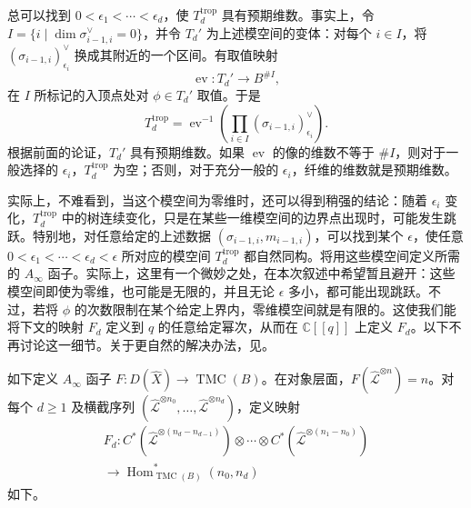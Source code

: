 总可以找到 $0<\epsilon_1<\cdots<\epsilon_d$，使 $T_d^{\mathrm{trop}}$ 具有预期维数。事实上，令 $I=\{i\mid\dim\sigma_{i-1,i}^\vee=0\}$，并令 $T_d'$ 为上述模空间的变体：对每个 $i\in I$，将 $(\sigma_{i-1,i})_{\epsilon_i}^\vee$ 换成其附近的一个区间。有取值映射
\[
\operatorname{ev}\colon T_d'\longrightarrow B^{\#I},
\]
在 $I$ 所标记的入顶点处对 $\phi\in T_d'$ 取值。于是
\[
T_d^{\mathrm{trop}}=
\operatorname{ev}^{-1}\left(\prod_{i\in I}(\sigma_{i-1,i})_{\epsilon_i}^\vee\right).
\]
根据前面的论证，$T_d'$ 具有预期维数。如果 $\operatorname{ev}$ 的像的维数不等于 $\#I$，则对于一般选择的 $\epsilon_i$，$T_d^{\mathrm{trop}}$ 为空；否则，对于充分一般的 $\epsilon_i$，纤维的维数就是预期维数。

实际上，不难看到，当这个模空间为零维时，还可以得到稍强的结论：随着 $\epsilon_i$ 变化，$T_d^{\mathrm{trop}}$ 中的树连续变化，只是在某些一维模空间的边界点出现时，可能发生跳跃。特别地，对任意给定的上述数据 $(\sigma_{i-1,i},m_{i-1,i})$，可以找到某个 $\epsilon$，使任意 $0<\epsilon_1<\cdots<\epsilon_d<\epsilon$ 所对应的模空间 $T_d^{\mathrm{trop}}$ 都自然同构。将用这些模空间定义所需的 $A_\infty$ 函子。实际上，这里有一个微妙之处，在本次叙述中希望暂且避开：这些模空间即使为零维，也可能是无限的，并且无论 $\epsilon$ 多小，都可能出现跳跃。不过，若将 $\phi$ 的次数限制在某个给定上界内，零维模空间就是有限的。这使我们能将下文的映射 $F_d$ 定义到 $q$ 的任意给定幂次，从而在 $\mathbb C[[q]]$ 上定义 $F_d$。以下不再讨论这一细节。关于更自然的解决办法，见。

如下定义 $A_\infty$ 函子 $F\colon D(\widehat X)\to\operatorname{TMC}(B)$。在对象层面，$F(\widehat{\mathcal L}^{\otimes n})=n$。对每个 $d\geq1$ 及横截序列 $(\widehat{\mathcal L}^{\otimes n_0},\ldots,\widehat{\mathcal L}^{\otimes n_d})$，定义映射
\[
\begin{gathered}
F_d\colon C^*(\widehat{\mathcal L}^{\otimes(n_d-n_{d-1})})
\otimes\cdots\otimes C^*(\widehat{\mathcal L}^{\otimes(n_1-n_0)})\\
\longrightarrow\operatorname{Hom}_{\operatorname{TMC}(B)}^*(n_0,n_d)
\end{gathered}
\]
如下。

